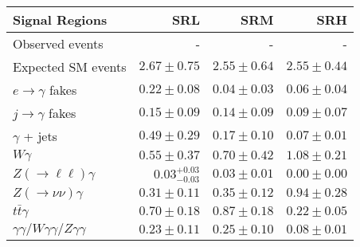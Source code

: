 \begin{tabular}{lrrr}
\hline
Signal Regions & SRL & SRM & SRH \\
\hline
Observed events & - & - & - \\
\hline
Expected SM events & $2.67 \pm 0.75$ & $2.55 \pm 0.64$ & $2.55 \pm 0.44$ \\
\hline
$e\rightarrow\gamma$ fakes & $0.22 \pm 0.08$ & $0.04 \pm 0.03$ & $0.06 \pm 0.04$ \\
$j\rightarrow\gamma$ fakes & $0.15 \pm 0.09$ & $0.14 \pm 0.09$ & $0.09 \pm 0.07$ \\
$\gamma$ + jets & $0.49 \pm 0.29$ & $0.17 \pm 0.10$ & $0.07 \pm 0.01$ \\
$W\gamma$ & $0.55 \pm 0.37$ & $0.70 \pm 0.42$ & $1.08 \pm 0.21$ \\
$Z(\rightarrow\ell\ell)\gamma$ & $0.03_{-0.03}^{+0.03}$ & $0.03 \pm 0.01$ & $0.00 \pm 0.00$ \\
$Z(\rightarrow\nu\nu)\gamma$ & $0.31 \pm 0.11$ & $0.35 \pm 0.12$ & $0.94 \pm 0.28$ \\
$t\bar{t}\gamma$ & $0.70 \pm 0.18$ & $0.87 \pm 0.18$ & $0.22 \pm 0.05$ \\
$\gamma\gamma / W\gamma\gamma / Z\gamma\gamma$ & $0.23 \pm 0.11$ & $0.25 \pm 0.10$ & $0.08 \pm 0.01$ \\
\hline
\end{tabular}
